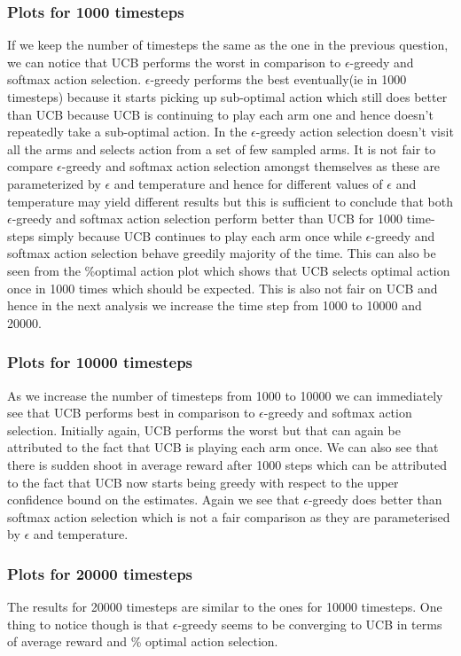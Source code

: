 \documentclass[english]{article}
\begin{document}
\subsubsection{Plots for 1000 timesteps}
If we keep the number of timesteps the same as the one in the previous question, we can notice that UCB performs the worst in comparison to $\epsilon$-greedy and softmax action selection. $\epsilon$-greedy performs the best eventually(ie in 1000 timesteps) because it starts picking up sub-optimal action which still does better than UCB because UCB is continuing to play each arm one and hence doesn't repeatedly take a sub-optimal action. In the $\epsilon$-greedy action selection doesn't visit all the arms and selects action from a set of few sampled arms. It is not fair to compare $\epsilon$-greedy and softmax action selection amongst themselves as these are parameterized by $\epsilon$ and temperature and hence for different values of $\epsilon$ and temperature may yield different results but this is sufficient to conclude that both $\epsilon$-greedy and softmax action selection perform better than UCB for 1000 time-steps simply because UCB continues to play each arm once while $\epsilon$-greedy and softmax action selection behave greedily majority of the time. This can also be seen from the \%optimal action plot which shows that UCB selects optimal action once in 1000 times which should be expected. This is also not fair on UCB and hence in the next analysis we increase the time step from 1000 to 10000 and 20000.

\subsubsection{Plots for 10000 timesteps}
As we increase the number of timesteps from 1000 to 10000 we can immediately see that UCB performs best in comparison to $\epsilon$-greedy and softmax action selection. Initially again, UCB performs the worst but that can again be attributed to the fact that UCB is playing each arm once. We can also see that there is sudden shoot in average reward after 1000 steps which can be attributed to the fact that UCB now starts being greedy with respect to the upper confidence bound on the estimates. Again we see that $\epsilon$-greedy does better than softmax action selection which is not a fair comparison as they are parameterised by $\epsilon$ and temperature.

\subsubsection{Plots for 20000 timesteps}
The results for 20000 timesteps are similar to the ones for 10000 timesteps. One thing to notice though is that $\epsilon$-greedy seems to be converging to UCB in terms of average reward and \% optimal action selection.
\end{document}
